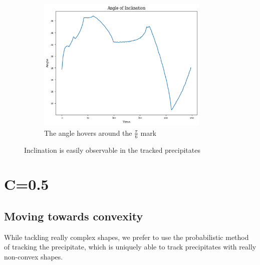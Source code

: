 \documentclass[12pt, a4paper]{report}
\begin{document}
\begin{figure}[H]
\begin{subfigure}{.45\textwidth}
  \includegraphics[width=0.9\textwidth]{Pictures/Results/3theta.jpeg}
  \caption{The angle hovers around the $\frac{\pi}{6}$ mark}
  \label{img:microstrImg}
\end{subfigure}
\caption{Inclination is easily observable in the tracked precipitates}
\label{fig:test}
\end{figure}

\section{C=0.5}
\subsection{Moving towards convexity}
While tackling really complex shapes, we prefer to use the probabilistic method of tracking the precipitate, which is uniquely able to track precipitates with really non-convex shapes. 
\end{document}
